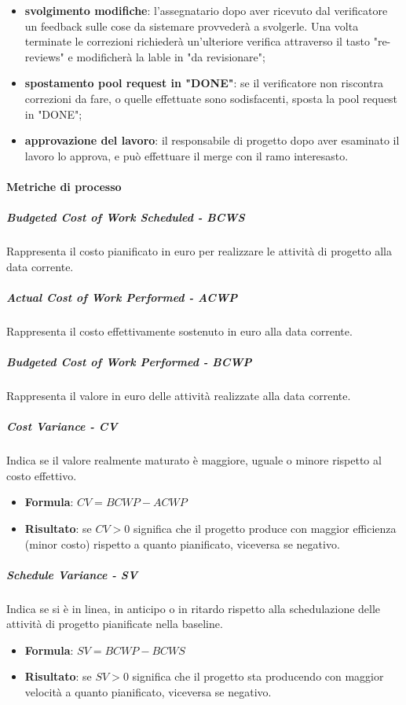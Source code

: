 \begin{itemize}
    \item \textbf{svolgimento modifiche}: l'assegnatario dopo aver ricevuto dal verificatore un feedback sulle cose da sistemare provvederà a svolgerle. Una volta terminate le correzioni richiederà un'ulteriore verifica attraverso il tasto "re-reviews" e modificherà la lable in "da revisionare";
    \item \textbf{spostamento pool request in "DONE"}: se il verificatore non riscontra correzioni da fare, o quelle effettuate sono sodisfacenti, sposta la pool request in "DONE";
    \item \textbf{approvazione del lavoro}: il responsabile di progetto dopo aver esaminato il lavoro lo approva, e può effettuare il merge con il ramo interesasto.
\end{itemize}
\paragraph{Metriche di processo}

\subparagraph{Budgeted Cost of Work Scheduled - BCWS}
Rappresenta il costo pianificato in euro per realizzare le attività di progetto alla data corrente.

\subparagraph{Actual Cost of Work Performed - ACWP}
Rappresenta il costo effettivamente sostenuto in euro alla data corrente.

\subparagraph{Budgeted Cost of Work Performed - BCWP}
Rappresenta il valore in euro delle attività realizzate alla data corrente.

\subparagraph{Cost Variance - CV}
Indica se il valore realmente maturato è maggiore, uguale o minore rispetto al costo effettivo.
\begin{itemize}
    \item \textbf{Formula}: $CV = BCWP - ACWP$
    \item \textbf{Risultato}: se $CV > 0$ significa che il progetto produce con maggior efficienza (minor costo) rispetto a quanto pianificato, viceversa se negativo.
\end{itemize}

\subparagraph{Schedule Variance - SV}
Indica se si è in linea, in anticipo o in ritardo rispetto alla schedulazione delle attività di progetto pianificate nella baseline.
\begin{itemize}
    \item \textbf{Formula}: $SV = BCWP - BCWS$
    \item \textbf{Risultato}: se $SV > 0$ significa che il progetto sta producendo con maggior velocità a quanto pianificato, viceversa se negativo.
\end{itemize}